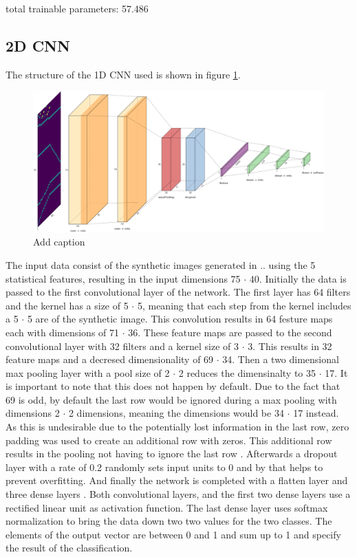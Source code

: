 total trainable parameters: 57.486

\subsection{2D CNN}
The structure of the 1D CNN used is shown in figure \ref{fig:2dCnnStructure}.
\begin{figure}[H]
	\centering
	\includegraphics[width=15cm]{images/2dCnnStructure_new.png}
	\caption[Bild kurz]{Add caption}
	\label{fig:2dCnnStructure}
\end{figure}
The input data consist of the synthetic images generated in ..  using the 5 statistical features, resulting in the input dimensions 75 $\cdot$ 40. Initially the data is passed to the first convolutional layer of the network. The first layer has 64 filters and the kernel has a size of 5 $\cdot$ 5, meaning that each step from the kernel includes a 5 $\cdot$ 5 are of the synthetic image. This convolution results in 64 festure maps each with dimensions of 71 $\cdot$ 36. These feature maps are passed to the second convolutional layer with 32 filters and a kernel size of 3 $\cdot$ 3. This results in 32 feature maps and a decresed dimensionality of 69 $\cdot$ 34. Then a two dimensional max pooling layer with a pool size of 2 $\cdot$ 2 reduces the dimensinalty to 35 $\cdot$ 17. It is important to note that this does not happen by default. Due to the fact that 69 is odd, by default the last row would be ignored during a max pooling with dimensions 2 $\cdot$ 2 dimensions, meaning the dimensions would be 34 $\cdot$ 17 instead. As this is undesirable due to the potentially lost information in the last row, zero padding was used to create an additional row with zeros. This additional row results in the pooling not having to ignore the last row . Afterwards a dropout layer with a rate of 0.2 randomly sets input units to 0 and by that helps to prevent overfitting. And finally the network is completed with a flatten layer and three dense layers . Both convolutional layers, and the first two dense layers use a rectified linear unit as activation function. The last dense layer uses softmax normalization to bring the data down two two values for the two classes. The elements of the output vector are between 0 and 1 and sum up to 1 and specify the result of the classification.


